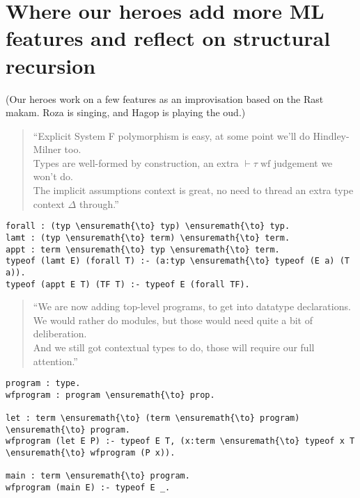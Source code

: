 \section{Where our heroes add more ML features and reflect on structural
recursion}\label{where-our-heroes-add-more-ml-features-and-reflect-on-structural-recursion}

\begin{scenecomment}
(Our heroes work on a few features as an improvisation based on the Rast makam. Roza is singing, and Hagop is playing the oud.)
\end{scenecomment}

\begin{verse}
``Explicit System F polymorphism is easy, at some point we'll do Hindley-Milner too. \\
Types are well-formed by construction, an extra $\vdash \tau \; \text{wf}$ judgement we won't do. \\
The implicit assumptions context is great, no need to thread an extra type context $\Delta$ through.''
\end{verse}

\begin{verbatim}
forall : (typ \ensuremath{\to} typ) \ensuremath{\to} typ.
lamt : (typ \ensuremath{\to} term) \ensuremath{\to} term.
appt : term \ensuremath{\to} typ \ensuremath{\to} term.
typeof (lamt E) (forall T) :- (a:typ \ensuremath{\to} typeof (E a) (T a)).
typeof (appt E T) (TF T) :- typeof E (forall TF).
\end{verbatim}

\begin{verse}
``We are now adding top-level programs, to get into datatype declarations. \\
We would rather do modules, but those would need quite a bit of deliberation. \\
And we still got contextual types to do, those will require our full attention.''
\end{verse}

\begin{verbatim}
program : type.
wfprogram : program \ensuremath{\to} prop.

let : term \ensuremath{\to} (term \ensuremath{\to} program) \ensuremath{\to} program.
wfprogram (let E P) :- typeof E T, (x:term \ensuremath{\to} typeof x T \ensuremath{\to} wfprogram (P x)).

main : term \ensuremath{\to} program.
wfprogram (main E) :- typeof E _.
\end{verbatim}

